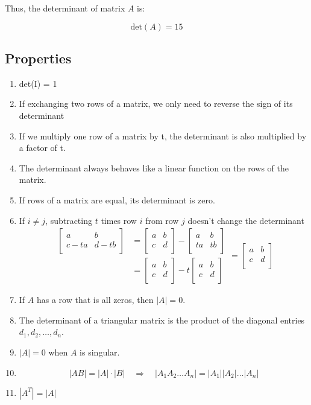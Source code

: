 \documentclass{article}
\begin{document}
Thus, the determinant of matrix \( A \) is:

\[
\text{det}(A) = 15
\]

\subsection{Properties}
\begin{enumerate}
    \item det(I) = 1
    \item If exchanging two rows of a matrix, we only need to reverse the sign of its determinant
    \item If we multiply one row of a matrix by t, the determinant is also multiplied by a factor of t.
    \item The determinant always behaves like a linear function on the rows of the matrix.
    \item If rows of a matrix are equal, its determinant is zero.
    \item If \( i \neq j \), subtracting \( t \) times row \( i \) from row \( j \) doesn't change the determinant
    $$
    \begin{array}{cc}
    \begin{bmatrix}
    a & b \\
    c - t a & d - t b \\
    \end{bmatrix} 
    & = 
    \begin{bmatrix}
    a & b \\
    c & d \\
    \end{bmatrix}
    - 
    \begin{bmatrix}
    a & b \\
    t a & t b \\
    \end{bmatrix} \\
    & = 
    \begin{bmatrix}
    a & b \\
    c & d \\
    \end{bmatrix}
    - t \begin{bmatrix}
    a & b \\
    c & d \\
    \end{bmatrix}
    \end{array}
    = 
    \begin{bmatrix}
    a & b \\
    c & d \\
    \end{bmatrix}
    $$

    \item If \( A \) has a row that is all zeros, then \( |A| = 0 \).
    \item The determinant of a triangular matrix is the product of the diagonal entries \( d_1, d_2, \dots, d_n \).
    \item \( |A| = 0 \) when \( A \) is singular.
    \item 
    \[
    |AB| = |A| \cdot |B|
    \quad \Rightarrow \quad |A_1 A_2 \dots A_n| = |A_1| |A_2| \dots |A_n|
    \]
    \item \( |A^T| = |A| \)
	\end{enumerate}
\end{document}
